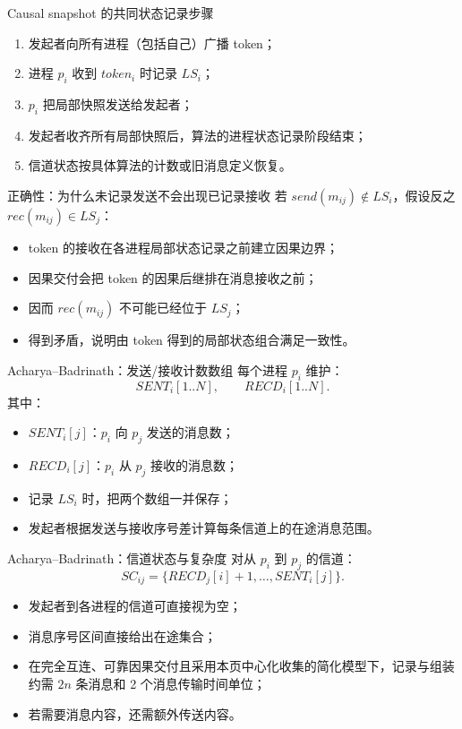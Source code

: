 \documentclass[UTF8,fontset=none,aspectratio=169,10pt]{beamer}
\begin{document}
\begin{frame}{Causal snapshot 的共同状态记录步骤}
\begin{enumerate}
  \item 发起者向所有进程（包括自己）广播 token；
  \item 进程 $p_i$ 收到 $token_i$ 时记录 $LS_i$；
  \item $p_i$ 把局部快照发送给发起者；
  \item 发起者收齐所有局部快照后，算法的进程状态记录阶段结束；
  \item 信道状态按具体算法的计数或旧消息定义恢复。
\end{enumerate}
\end{frame}

\begin{frame}{正确性：为什么未记录发送不会出现已记录接收}
若 $send(m_{ij})\notin LS_i$，假设反之 $rec(m_{ij})\in LS_j$：
\begin{itemize}
  \item token 的接收在各进程局部状态记录之前建立因果边界；
  \item 因果交付会把 token 的因果后继排在消息接收之前；
  \item 因而 $rec(m_{ij})$ 不可能已经位于 $LS_j$；
  \item 得到矛盾，说明由 token 得到的局部状态组合满足一致性。
\end{itemize}
\end{frame}

\begin{frame}{Acharya--Badrinath：发送/接收计数数组}
每个进程 $p_i$ 维护：
\[
SENT_i[1..N],\qquad RECD_i[1..N].
\]
其中：
\begin{itemize}
  \item $SENT_i[j]$：$p_i$ 向 $p_j$ 发送的消息数；
  \item $RECD_i[j]$：$p_i$ 从 $p_j$ 接收的消息数；
  \item 记录 $LS_i$ 时，把两个数组一并保存；
  \item 发起者根据发送与接收序号差计算每条信道上的在途消息范围。
\end{itemize}
\end{frame}

\begin{frame}{Acharya--Badrinath：信道状态与复杂度}
对从 $p_i$ 到 $p_j$ 的信道：
\[
SC_{ij}=\{RECD_j[i]+1,\ldots,SENT_i[j]\}.
\]
\begin{itemize}
  \item 发起者到各进程的信道可直接视为空；
  \item 消息序号区间直接给出在途集合；
  \item 在完全互连、可靠因果交付且采用本页中心化收集的简化模型下，记录与组装约需 $2n$ 条消息和 2 个消息传输时间单位；
  \item 若需要消息内容，还需额外传送内容。
\end{itemize}
\end{frame}
\end{document}
